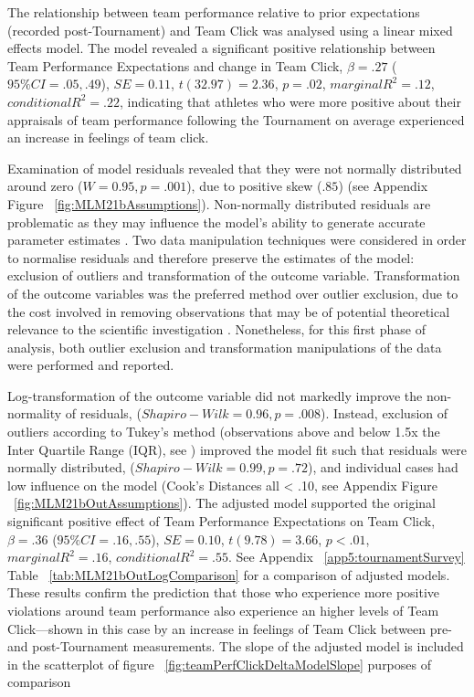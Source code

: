 \begin{landscape}
The relationship between team performance relative to prior expectations (recorded post-Tournament) and Team Click was analysed using a linear mixed effects model. The model revealed a significant positive relationship between Team Performance Expectations and change in Team Click,  $\beta = .27$ ($95\% CI =  .05, .49$), $SE = 0.11$, $t(32.97) = 2.36$, $p = .02$, $marginal R^2 = .12$, $conditional R^2 = .22$, indicating that athletes who were more positive about their appraisals of team performance following the Tournament on average experienced an increase in feelings of team click.

Examination of model residuals revealed that they were not normally distributed around zero ($W = 0.95, p = .001$), due to positive skew ($.85$) (see Appendix Figure ~\ref{fig:MLM21bAssumptions}).  Non-normally distributed residuals are problematic as they may influence the model's ability to generate accurate parameter estimates . Two data manipulation techniques were considered in order to normalise residuals and therefore preserve the estimates of the model: exclusion of outliers and transformation of the outcome variable.  Transformation of the outcome variables was the preferred method over outlier exclusion, due to the cost involved in removing observations that may be of potential theoretical relevance to the scientific investigation \citep{Rousseeuw2011}. Nonetheless, for this first phase of analysis, both outlier exclusion and transformation manipulations of the data were performed and reported.

Log-transformation of the outcome variable did not markedly improve the non-normality of residuals, ($Shapiro-Wilk = 0.96, p = .008$).  Instead, exclusion of outliers according to Tukey's method (observations above and below 1.5x the Inter Quartile Range (IQR), see \citep{Tukey1977}) improved the model fit such that residuals were normally distributed, ($Shapiro-Wilk = 0.99, p = .72$), and individual cases had low influence on the model (Cook's Distances all < .10, see Appendix Figure ~\ref{fig:MLM21bOutAssumptions}).
The adjusted model supported the original significant positive effect of Team Performance Expectations on Team Click, $\beta = .36$ ($95\% CI =  .16, .55$), $SE = 0.10$, $t(9.78) = 3.66$, $p < .01$, $marginal R^2 = .16$, $conditional R^2 = .55$.
See Appendix ~\ref{app5:tournamentSurvey} Table ~\ref{tab:MLM21bOutLogComparison} for a comparison of adjusted models. These results confirm the prediction that those who experience more positive violations around team performance also experience an higher levels of Team Click---shown in this case by an increase in feelings of Team Click between pre- and post-Tournament measurements.  The slope of the adjusted model is included in the scatterplot of figure ~\ref{fig:teamPerfClickDeltaModelSlope} purposes of comparison


\end{landscape}
